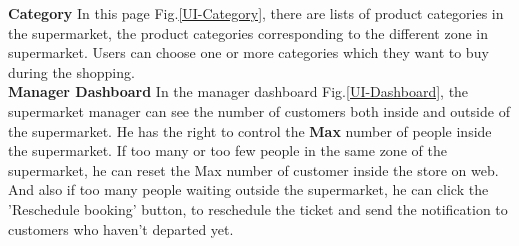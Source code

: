 \documentclass[a4paper,12pt]{report}
\begin{document}
\textbf{Category} In this page Fig.\ref{UI-Category}, there are lists of product categories in the supermarket, the product categories corresponding to the different zone in supermarket. Users can choose one or more categories which they want to buy during the shopping.\\ 

\textbf{Manager Dashboard} In the manager dashboard Fig.\ref{UI-Dashboard}, the supermarket manager can see the number of customers both inside and outside of the supermarket. He has the right to control the \textbf{Max} number of people inside the supermarket. If too many or too few people in the same zone of the supermarket, he can reset the Max number of customer inside the store on web. And also if too many people waiting outside the supermarket, he can click the 'Reschedule booking' button, to reschedule the ticket and send the notification to customers who haven't departed yet.\\ 
\end{document}
